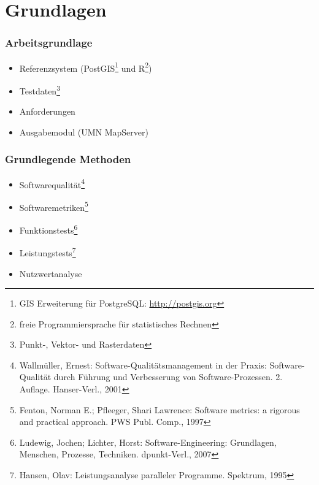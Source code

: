 \documentclass{beamer}
\begin{document}
\section{Grundlagen}
\begin{frame}\frametitle{Arbeitsgrundlage} 
\begin{itemize}
\item Referenzsystem (PostGIS\footnote{GIS Erweiterung für PostgreSQL: \url{http://postgis.org}} und R\footnote{freie Programmiersprache für statistisches Rechnen}) %
\item Testdaten\footnote{Punkt-, Vektor- und Rasterdaten}

\item Anforderungen
\item Ausgabemodul (UMN MapServer)
\end{itemize}
\end{frame}

\begin{frame}\frametitle{Grundlegende Methoden} 
\begin{itemize}
\item Softwarequalität\footnote{Wallmüller, Ernest: Software-Qualitätsmanagement in der Praxis: Software-Qualität durch Führung und Verbesserung von Software-Prozessen. 2. Auflage. Hanser-Verl., 2001}
\item Softwaremetriken\footnote{Fenton, Norman E.; Pfleeger, Shari Lawrence: Software metrics: a rigorous and practical approach. PWS Publ. Comp., 1997}
\item Funktionstests\footnote{Ludewig, Jochen; Lichter, Horst: Software-Engineering: Grundlagen, Menschen, Prozesse, Techniken. dpunkt-Verl., 2007}
\item Leistungstests\footnote{Hansen, Olav: Leistungsanalyse paralleler Programme. Spektrum, 1995}
\item Nutzwertanalyse
%
\end{itemize}
\end{frame}
\end{document}
